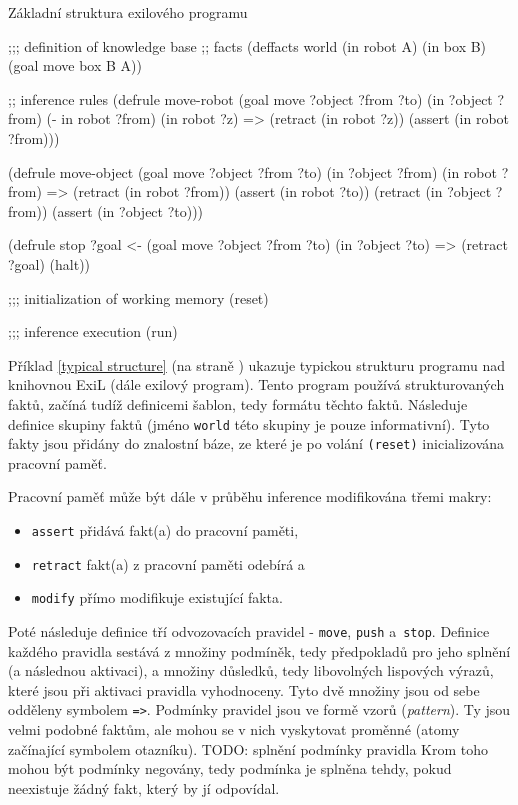 \begin{listing}[h]
\caption{Základní struktura exilového programu}
\label{typical structure}
\begin{clcode}
;;; definition of knowledge base
;; facts
(deffacts world
  (in robot A)
  (in box B)
  (goal move box B A))

;; inference rules
(defrule move-robot
  (goal move ?object ?from ?to)
  (in ?object ?from)
  (- in robot ?from)
  (in robot ?z)
  =>
  (retract (in robot ?z))
  (assert (in robot ?from)))

(defrule move-object
  (goal move ?object ?from ?to)
  (in ?object ?from)
  (in robot ?from)
  =>
  (retract (in robot ?from))
  (assert (in robot ?to))
  (retract (in ?object ?from))
  (assert (in ?object ?to)))

(defrule stop
  ?goal <- (goal move ?object ?from ?to)
  (in ?object ?to)
  =>
  (retract ?goal)
  (halt))

;;; initialization of working memory
(reset)

;;; inference execution
(run)
\end{clcode}
\end{listing}

Příklad \ref{typical structure} (na straně \pageref{typical structure}) ukazuje
typickou strukturu programu nad knihovnou ExiL (dále exilový program). Tento
program používá strukturovaných faktů, začíná tudíž definicemi šablon, tedy
formátu těchto faktů. Následuje definice skupiny faktů (jméno \verb|world| této
skupiny je pouze informativní). Tyto fakty jsou přidány do znalostní báze, ze
které je po volání \verb|(reset)| inicializována pracovní paměť.

Pracovní paměť může být dále v průběhu inference modifikována třemi makry:
\begin{itemize}
  \item \verb|assert| přidává fakt(a) do pracovní paměti,
  \item \verb|retract| fakt(a) z pracovní paměti odebírá a
  \item \verb|modify| přímo modifikuje existující fakta.
\end{itemize}

Poté následuje definice tří odvozovacích pravidel - \verb|move|, \verb|push|
a~\verb|stop|. Definice každého pravidla sestává z množiny podmíněk, tedy
předpokladů pro jeho splnění (a následnou aktivaci), a množiny důsledků, tedy
libovolných lispových výrazů, které jsou při aktivaci pravidla vyhodnoceny.
Tyto dvě množiny jsou od sebe odděleny symbolem \verb|=>|. Podmínky pravidel
jsou ve formě vzorů (\emph{pattern}). Ty jsou velmi podobné faktům, ale mohou se
v nich vyskytovat proměnné (atomy začínající symbolem otazníku).
TODO: splnění podmínky pravidla
Krom toho mohou
být podmínky negovány, tedy podmínka je splněna tehdy, pokud neexistuje žádný
fakt, který by jí odpovídal.

